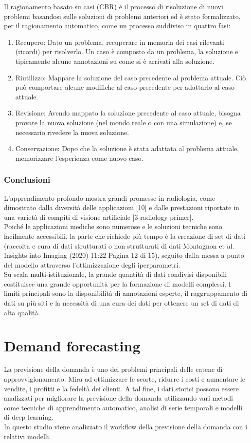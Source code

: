 \documentclass[12pt,a4paper]{report}
\begin{document}
Il ragionamento basato su casi (CBR) è il processo di risoluzione di nuovi problemi basandosi sulle soluzioni di problemi anteriori ed è stato formalizzato, per il ragionamento automatico, come un processo suddiviso in quattro fasi:
\begin{enumerate}
\item Recupero: Dato un problema, recuperare in memoria dei casi rilevanti (ricordi) per risolverlo. Un caso è composto da un problema, la soluzione e tipicamente alcune annotazioni su come si è arrivati alla soluzione.
\item Riutilizzo: Mappare la soluzione del caso precedente al problema attuale. Ciò può comportare alcune modifiche al caso precedente per adattarlo al caso attuale.
\item Revisione: Avendo mappato la soluzione precedente al caso attuale, bisogna provare la nuova soluzione (nel mondo reale o con una simulazione) e, se necessario rivedere la nuova soluzione.
\item Conservazione: Dopo che la soluzione è stata adattata al problema attuale, memorizzare l'esperienza come nuovo caso.
\end{enumerate}

\subsection{Conclusioni}
L'apprendimento profondo mostra grandi promesse in radiologia, come dimostrato dalla diversità delle applicazioni [10] e dalle prestazioni riportate in una varietà di compiti di visione artificiale [3-radiology primer].\\
Poiché le applicazioni mediche sono numerose e le soluzioni tecniche sono facilmente accessibili, la parte che richiede più tempo è la creazione di set di dati (raccolta e cura di dati strutturati o non strutturati di dati Montagnon et al. Insights into Imaging (2020) 11:22 Pagina 12 di 15), seguito dalla messa a punto del modello attraverso l'ottimizzazione degli iperparametri.\\
Su scala multi-istituzionale, la grande quantità di dati condivisi disponibili costituisce una grande opportunità per la formazione di modelli complessi. I limiti principali sono la disponibilità di annotazioni esperte, il raggruppamento di dati su più siti e la necessità di una cura dei dati per ottenere un set di dati di alta qualità. 


\chapter{Demand forecasting}
La previsione della domanda è uno dei problemi principali delle catene di approvvigionamento. Mira ad ottimizzare le scorte, ridurre i costi e aumentare le vendite, i profitti e la fedeltà dei clienti. A tal fine, i dati storici possono essere analizzati per migliorare la previsione della domanda utilizzando vari metodi come tecniche di apprendimento automatico, analisi di serie temporali e modelli di deep learning.\\
In questo studio viene analizzato il workflow della previsione della domanda con i relativi modelli. 
\end{document}
